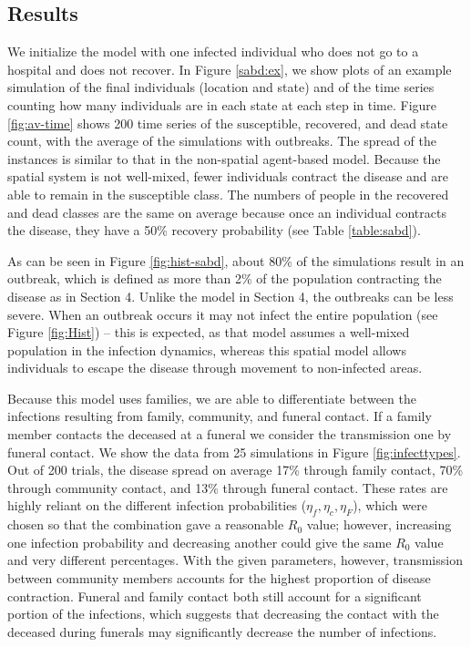 \subsection{Results}
We initialize the model with one infected individual who does not go to a hospital and does not recover. In Figure \ref{sabd:ex}, we show plots of an example simulation of the final individuals (location and state) and of the time series counting how many individuals are in each state at each step in time. Figure \ref{fig:av-time} shows 200 time series of the susceptible, recovered, and dead state count, with the average of the simulations with outbreaks. The spread of the instances is similar to that in the non-spatial agent-based model. Because the spatial system is not well-mixed, fewer individuals contract the disease and are able to remain in the susceptible class. The numbers of people in the recovered and dead classes are the same on average because once an individual contracts the disease, they have a 50\% recovery probability (see Table \ref{table:sabd}).

As can be seen in Figure \ref{fig:hist-sabd}, about 80\% of the simulations result in an outbreak, which is defined as more than 2\% of the population contracting the disease as in Section 4. Unlike the model in Section 4, the outbreaks can be less severe. When an outbreak occurs it may not infect the entire population (see Figure \ref{fig:Hist}) -- this is expected, as that model assumes a well-mixed population in the infection dynamics, whereas this spatial model allows individuals to escape the disease through movement to non-infected areas.

Because this model uses families, we are able to differentiate between the infections resulting from family, community, and funeral contact. If a family member contacts the deceased at a funeral we consider the transmission one by funeral contact. We show the data from 25 simulations in Figure \ref{fig:infecttypes}. Out of 200 trials, the disease spread on average 17\% through family contact, 70\% through community contact, and 13\% through funeral contact. These rates are highly reliant on the different infection probabilities ($\eta_f,\eta_c,\eta_F$), which were chosen so that the combination gave a reasonable $R_0$ value; however, increasing one infection probability and decreasing another could give the same $R_0$ value and very different percentages. With the given parameters, however, transmission between community members accounts for the highest proportion of disease contraction. Funeral and family contact both still account for a significant portion of the infections, which suggests that decreasing the contact with the deceased during funerals may significantly decrease the number of infections.

